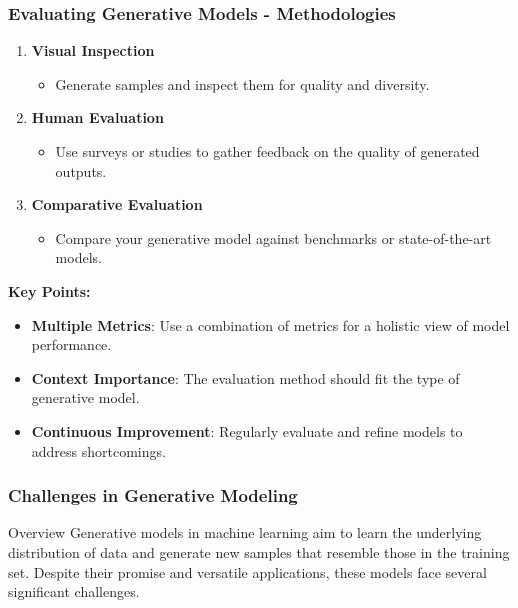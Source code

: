 \documentclass[aspectratio=169]{beamer}
\begin{document}
\begin{frame}[fragile]
    \frametitle{Evaluating Generative Models - Methodologies}
    \begin{enumerate}
        \item \textbf{Visual Inspection}
            \begin{itemize}
                \item Generate samples and inspect them for quality and diversity.
            \end{itemize}
        
        \item \textbf{Human Evaluation}
            \begin{itemize}
                \item Use surveys or studies to gather feedback on the quality of generated outputs.
            \end{itemize}
        
        \item \textbf{Comparative Evaluation}
            \begin{itemize}
                \item Compare your generative model against benchmarks or state-of-the-art models.
            \end{itemize}
    \end{enumerate}
    
    \textbf{Key Points:}
    \begin{itemize}
        \item \textbf{Multiple Metrics}: Use a combination of metrics for a holistic view of model performance.
        \item \textbf{Context Importance}: The evaluation method should fit the type of generative model.
        \item \textbf{Continuous Improvement}: Regularly evaluate and refine models to address shortcomings.
    \end{itemize}
\end{frame}

\begin{frame}[fragile]
  \frametitle{Challenges in Generative Modeling}
  \begin{block}{Overview}
    Generative models in machine learning aim to learn the underlying distribution of data and generate new samples that resemble those in the training set. 
    Despite their promise and versatile applications, these models face several significant challenges. 
  \end{block}
\end{frame}
\end{document}
